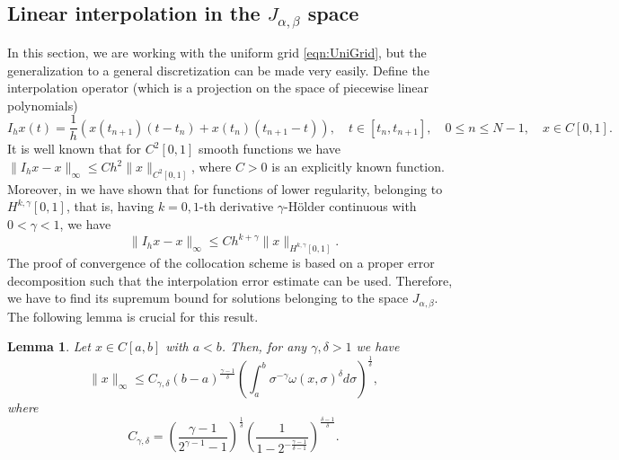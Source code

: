 \documentclass[12pt,a4paper]{article}
\newtheorem{lem}{Lemma}
\begin{document}
\subsection{Linear interpolation in the $J_{\alpha,\beta}$ space}
In this section, we are working with the uniform grid \eqref{eqn:UniGrid}, but the generalization to a general discretization can be made very easily. Define the interpolation operator (which is a projection on the space of piecewise linear polynomials)
\begin{equation}\label{eqn:LinearInterpolation}
	I_h x(t) = \frac{1}{h} \left(x(t_{n+1}) (t- t_n) + x(t_n) (t_{n+1}- t)\right), \quad t \in [t_{n}, t_{n+1}], \quad 0\leq n \leq N-1, \quad x \in C[0,1].
\end{equation}
It is well known that for $C^2[0,1]$ smooth functions we have $\|I_h x - x\|_\infty \leq C h^2 \|x\|_{C^2[0,1]}$, where $C>0$ is an explicitly known function. Moreover, in \cite{caballero2025functional} we have shown that for functions of lower regularity, belonging to $H^{k,\gamma}[0,1]$, that is, having $k=0,1$-th derivative $\gamma$-H\"older continuous with $0<\gamma<1$, we have
\begin{equation}
	\|I_h x - x\|_\infty \leq C h^{k+\gamma} \|x\|_{H^{k,\gamma}[0,1]}.
\end{equation}
The proof of convergence of the collocation scheme is based on a proper error decomposition such that the interpolation error estimate can be used. Therefore, we have to find its supremum bound for solutions belonging to the space $J_{\alpha,\beta}$. The following lemma is crucial for this result.
\begin{lem}
	Let $x \in C[a,b]$ with $a<b$. Then, for any $\gamma, \delta >1$ we have
	\begin{equation}\label{eqn:FundamentalEstimate}
		\|x\|_\infty \leq C_{\gamma, \delta} (b-a)^\frac{\gamma-1}{\delta} \left(\int_{a}^{b} \sigma^{-\gamma} \omega(x, \sigma)^\delta d\sigma\right)^\frac{1}{\delta},
	\end{equation}
	where
	\begin{equation}
		C_{\gamma,\delta} = 
		\left(\frac{\gamma-1}{2^{\gamma-1}-1}\right)^\frac{1}{\delta} \left(\frac{1}{1-2^{-\frac{\gamma-1}{\delta-1}}}\right)^\frac{\delta-1}{\delta}.
	\end{equation}
\end{lem}
\end{document}
